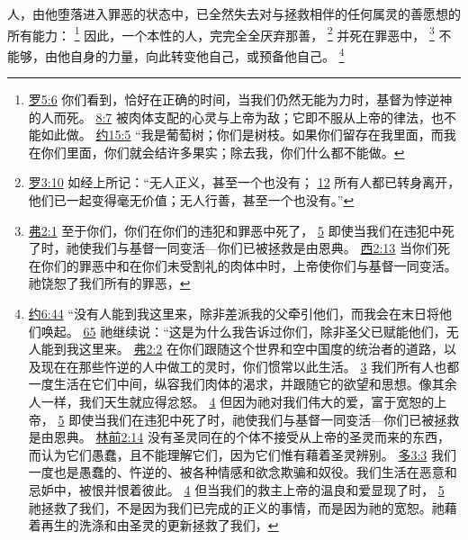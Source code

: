 \documentclass[12pt, a4paper, oneside]{ctexart}
\newcounter{parnum}[section]
\newcommand{\N}{%
   \noindent\refstepcounter{parnum}%
    \makebox[\parindent][l]{\textbf{\arabic{parnum}.}}}
\begin{document}
\N 人，由他堕落进入罪恶的状态中，已全然失去对与拯救相伴的任何属灵的善愿想的所有能力：
	\footnote {
		\href{https://biblehub.com/romans/5-6.htm}{罗5:6} 你们看到，恰好在正确的时间，当我们仍然无能为力时，基督为悖逆神的人而死。
		\href{https://biblehub.com/romans/8-7.htm}{8:7} 被肉体支配的心灵与上帝为敌；它即不服从上帝的律法，也不能如此做。
		\href{https://biblehub.com/john/15-5.htm}{约15:5} “我是葡萄树；你们是树枝。如果你们留存在我里面，而我在你们里面，你们就会结许多果实；除去我，你们什么都不能做。
	}
	因此，一个本性的人，完完全全厌弃那善，
	\footnote {
		\href{https://biblehub.com/romans/3-10.htm}{罗3:10} 如经上所记：“无人正义，甚至一个也没有；
		\href{https://biblehub.com/romans/3-12.htm}{12} 所有人都已转身离开，他们已一起变得毫无价值；无人行善，甚至一个也没有。”
	}
	并死在罪恶中，
	\footnote {
		\href{https://biblehub.com/ephesians/2-1.htm}{弗2:1} 至于你们，你们在你们的违犯和罪恶中死了， 
		\href{https://biblehub.com/ephesians/2-5.htm}{5} 即使当我们在违犯中死了时，祂使我们与基督一同变活---你们已被拯救是由恩典。
		\href{https://biblehub.com/colossians/2-13.htm}{西2:13} 当你们死在你们的罪恶中和在你们未受割礼的肉体中时，上帝使你们与基督一同变活。祂饶恕了我们所有的罪恶，
	}
	不能够，由他自身的力量，向此转变他自己，或预备他自己。
	\footnote {
		\href{https://biblehub.com/john/6-44.htm}{约6:44} “没有人能到我这里来，除非差派我的父牵引他们，而我会在末日将他们唤起。
		\href{https://biblehub.com/john/6-65.htm}{65} 祂继续说：“这是为什么我告诉过你们，除非圣父已赋能他们，无人能到我这里来。
		\href{https://biblehub.com/ephesians/2-2.htm}{弗2:2} 在你们跟随这个世界和空中国度的统治者的道路，以及现在在那些忤逆的人中做工的灵时，你们惯常以此生活。
		\href{https://biblehub.com/ephesians/2-3.htm}{3} 我们所有人也都一度生活在它们中间，纵容我们肉体的渴求，并跟随它的欲望和思想。像其余人一样，我们天生就应得忿怒。
		\href{https://biblehub.com/ephesians/2-4.htm}{4} 但因为祂对我们伟大的爱，富于宽恕的上帝，
		\href{https://biblehub.com/ephesians/2-5.htm}{5} 即使当我们在违犯中死了时，祂使我们与基督一同变活---你们已被拯救是由恩典。
		\href{https://biblehub.com/1_corinthians/2-14.htm}{林前2:14} 没有圣灵同在的个体不接受从上帝的圣灵而来的东西，而认为它们愚蠢，且不能理解它们，因为它们惟有藉着圣灵辨别。
		\href{https://biblehub.com/titus/3-3.htm}{多3:3} 我们一度也是愚蠢的、忤逆的、被各种情感和欲念欺骗和奴役。我们生活在恶意和忌妒中，被恨并恨着彼此。
		\href{https://biblehub.com/titus/3-4.htm}{4} 但当我们的救主上帝的温良和爱显现了时，
		\href{https://biblehub.com/titus/3-5.htm}{5} 祂拯救了我们，不是因为我们已完成的正义的事情，而是因为祂的宽恕。祂藉着再生的洗涤和由圣灵的更新拯救了我们，
	}
\end{document}
